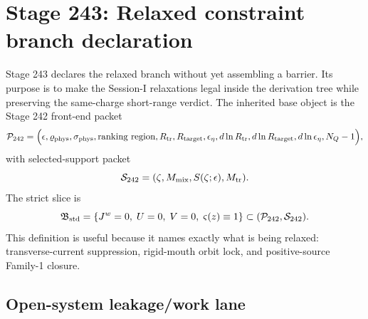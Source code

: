 \section{Stage 243: Relaxed constraint branch declaration}
\label{sec:app-part08:relaxed-constraint-branch-declaration}
\label{stage:243}


Stage 243 declares the relaxed branch without yet assembling a barrier.  Its purpose is to make the Session-I relaxations legal inside the derivation tree while preserving the same-charge short-range verdict.  The inherited base object is the Stage 242 front-end packet
\begin{equation}
\label{eq:app-part08-p225-packet}
\mathcal P_{242}
=
\Bigl(
\epsilon,
\varrho_{\rm phys},
\sigma_{\rm phys},
\text{ranking region},
R_{\rm tr},
R_{\rm target},
\epsilon_\eta,
 d\ln R_{\rm tr},
 d\ln R_{\rm target},
 d\ln\epsilon_\eta,
 N_Q-1
\Bigr),
\end{equation}
with selected-support packet
\begin{equation}
\label{eq:app-part08-s225-packet}
\mathcal S_{242}=(\zeta,M_{\rm mix},S(\zeta;\epsilon),M_{\rm tr}).
\end{equation}
The strict slice is
\begin{equation}
\label{eq:app-part08-std-branch-slice}
\mathfrak B_{\rm std}
=
\left\{
J^w=0,
\;U=0,
\;V=0,
\;\varsigma(z)\equiv 1
\right\}
\subset(\mathcal P_{242},\mathcal S_{242}).
\end{equation}
This definition is useful because it names exactly what is being relaxed: transverse-current suppression, rigid-mouth orbit lock, and positive-source Family-1 closure.

\subsection{Open-system leakage/work lane}
\label{subsec:app-part08-open-lane}

